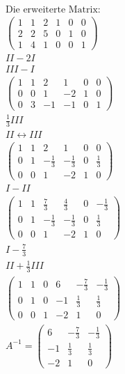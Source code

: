 \begin{align*}
    \text{Die erweiterte Matrix:} \\
    \begin{pmatrix}
        1 & 1 & 2 & 1 & 0 & 0 \\
        2 & 2 & 5 & 0 & 1 & 0 \\
        1 & 4 & 1 & 0 & 0 & 1
    \end{pmatrix} \\
    II - 2I \\
    III - I \\
    \begin{pmatrix}
        1 & 1 & 2 & 1 & 0 & 0 \\
        0 & 0 & 1 & -2 & 1 & 0 \\
        0 & 3 & -1 & -1 & 0 & 1
    \end{pmatrix} \\
    \frac{1}{3}III \\
    II \leftrightarrow III \\
    \begin{pmatrix}
        1 & 1 & 2 & 1 & 0 & 0 \\
        0 & 1 & -\frac{1}{3} & -\frac{1}{3} & 0 & \frac{1}{3} \\
        0 & 0 & 1 & -2 & 1 & 0
    \end{pmatrix} \\
    I - II \\
    \begin{pmatrix}
        1 & 1 & \frac{7}{3} & \frac{4}{3} & 0 & -\frac{1}{3} \\
        0 & 1 & -\frac{1}{3} & -\frac{1}{3} & 0 & \frac{1}{3} \\
        0 & 0 & 1 & -2 & 1 & 0
    \end{pmatrix} \\
    I - \frac{7}{3} \\
    II + \frac{1}{3}III \\
    \begin{pmatrix}
        1 & 1 & 0 & 6 & -\frac{7}{3} & -\frac{1}{3} \\
        0 & 1 & 0 & -1 & \frac{1}{3} & \frac{1}{3} \\
        0 & 0 & 1 & -2 & 1 & 0 
    \end{pmatrix} \\
    A^{-1} = \begin{pmatrix}
        6 & -\frac{7}{3} & -\frac{1}{3} \\
        -1 & \frac{1}{3} & \frac{1}{3} \\
        -2 & 1 & 0 
    \end{pmatrix}
\end{align*}

